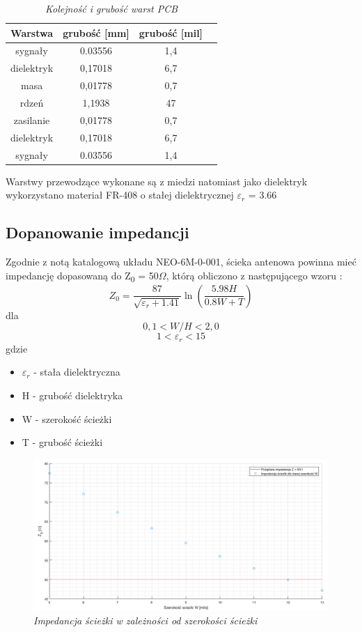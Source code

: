 \documentclass[eng,printmode]{mgr}
\begin{document}
\begin{table}[htb]
\def\arraystretch{1.3}%
\caption{\textit{ Kolejność i grubość warst PCB}}
\label{tab:pcbStack}
\begin{center}
\def\arraystretch{1.3}%
\begin{tabular}{ |c|c|c|c| }
\hline
Warstwa& grubość [mm] & grubość [mil] \\ 
\hline
sygnały & 0.03556 & 1,4 \\ 
\hline
dielektryk & 0,17018 & 6,7\\ 
\hline
masa & 0,01778 & 0,7\\ 
\hline
rdzeń & 1,1938 & 47\\ 
\hline
zasilanie & 0,01778 & 0,7\\ 
\hline
dielektryk & 0,17018 & 6,7\\ 
\hline
sygnały & 0.03556 & 1,4 \\ 
\hline
\end{tabular}
\end{center}
\end{table}

Warstwy przewodzące wykonane są z miedzi natomiast jako dielektryk wykorzystano materiał FR-408 o stałej dielektrycznej \textbf{$\varepsilon_r$} = 3.66

\subsection*{Dopanowanie impedancji}
Zgodnie z notą katalogową układu NEO-6M-0-001, ścieka antenowa powinna mieć impedancję dopasowaną do Z\textsubscript{0} = 50\textbf{$\Omega$}, którą obliczono z następującego wzoru :
\begin{equation}
Z_0= \frac{87}{\sqrt{\varepsilon_r + 1.41}}\ln{\left(\frac{5.98H}{0.8W + T}\right)} \label{eq:gps_z0}
\end{equation}
dla 
$$
0,1 < W/H < 2,0
$$
$$
1 < \varepsilon_r < 15
$$
gdzie
\begin{itemize}
  \item \textbf{$\varepsilon_r$} - stała dielektryczna
  \item H - grubość dielektryka
  \item W - szerokość ścieżki
  \item T - grubość ścieżki
\end{itemize}
\newpage
\begin{figure}[!h]
    \centering
    \includegraphics[width=\textwidth]{plots/gpsZ0.png}
    \caption{\textit{\scriptsize Impedancja ścieżki w zależności od szerokości ścieżki}}
\end{figure}
\end{document}

